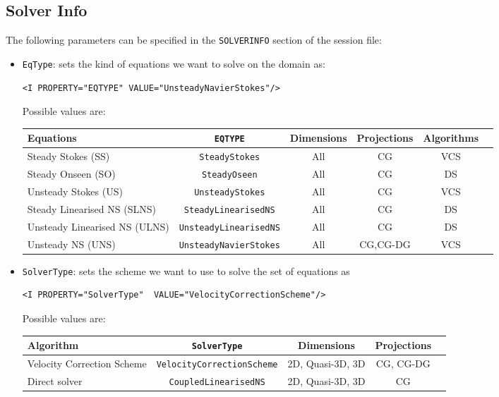 \subsection{Solver Info}

The following parameters can be specified in the \texttt{SOLVERINFO} section of
the session file:

\begin{itemize}
\item \texttt{EqType}: sets the kind of equations we want to solve on the domain as:

\begin{lstlisting}[style=XMLStyle]
<I PROPERTY="EQTYPE" VALUE="UnsteadyNavierStokes"/>
\end{lstlisting}

Possible values are:

\begin{table}
\begin{center}
\begin{tabular}{|l|c|c|c|c|c|} \hline
{Equations} & {\texttt{EQTYPE}} &{Dimensions}&{Projections} & Algorithms\\ \hline
Steady Stokes (SS)& \texttt{SteadyStokes} & All & CG &VCS \\ \hline
Steady Onseen (SO) & \texttt{SteadyOseen} & All & CG& DS \\ \hline
Unsteady Stokes (US) & \texttt{UnsteadyStokes} & All & CG &VCS \\ \hline
Steady Linearised NS (SLNS) & \texttt{SteadyLinearisedNS} & All & CG & DS \\ \hline
Unsteady Linearised NS (ULNS) & \texttt{UnsteadyLinearisedNS} & All & CG & DS \\ \hline
Unsteady NS (UNS) & \texttt{UnsteadyNavierStokes} & All & CG,CG-DG & VCS \\ \hline

\end{tabular}
\end{center}
\end{table}


\item \texttt{SolverType}: sets the scheme we want to use to solve the set of equations as 

\begin{lstlisting}[style=XMLStyle]
<I PROPERTY="SolverType"  VALUE="VelocityCorrectionScheme"/>\end{lstlisting}

Possible values are:

\begin{table}
\begin{center}
\begin{tabular}{|l|c|c|c|c|} \hline
{Algorithm} & {\texttt{SolverType}} &{Dimensions}&{Projections} \\ \hline
Velocity Correction Scheme & \texttt{VelocityCorrectionScheme} & 2D, Quasi-3D, 3D & CG, CG-DG\\ \hline
Direct solver & \texttt{CoupledLinearisedNS} & 2D, Quasi-3D, 3D &CG\\ \hline
\end{tabular}
\end{center}
\end{table}


\end{itemize}

